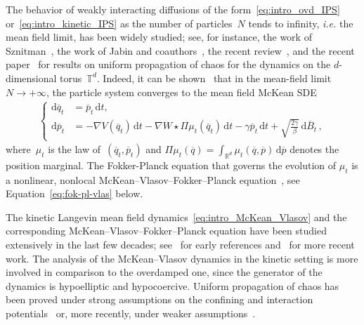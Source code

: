 \documentclass[onefignum,onetabnum]{siamart251216} %
\renewcommand{\d}{\mathrm{d}}
\newcommand{\torus}{\mathbb T}
\newcommand{\mescin}{\mu}
\newcommand{\projp}{\Pi}
\newcommand{\ql}{\overline q}
\newcommand{\pl}{\overline p}
\newcommand{\bl}{\overline B}
\theoremstyle{plain}
\numberwithin{equation}{section}
\numberwithin{theorem}{section}
\begin{document}
The behavior of weakly interacting diffusions of the form~\eqref{eq:intro_ovd_IPS} or~\eqref{eq:intro_kinetic_IPS} as the number of particles~$N$ tends to infinity, \textit{i.e.}\!\! the mean field limit, has been widely studied; see, for instance, the work of Sznitman~\cite{sznitman1991topics},
the work of Jabin and coauthors~\cite{jabin2014review,jabin2016mean,jabin2017mean},
the recent review~\cite{chaintron2022propagationI,chaintron2021propagationII},
and the recent paper~\cite{delarue2025uniform} for results on uniform propagation of chaos for the dynamics on the $d$-dimensional torus~$\torus^d$.
Indeed, it can be shown~\cite{GLWZ2021, guillin2021uniform} that in the mean-field limit~$N\to +\infty$, the particle system converges to the mean field McKean SDE
\begin{align}
    \label{eq:intro_McKean_Vlasov}
    \left\{
        \begin{aligned}
            \d \ql_t &= \displaystyle \pl_t \,\d t, \, \\
            \d \pl_t &= \displaystyle -\nabla V(\ql_t) \,\d t - \nabla W \star \projp \mescin_t (\ql_t)\,\d t -\gamma \pl_t \,\d t +\sqrt{\frac{2\gamma}{\beta}}\,\d \bl_t \, ,
        \end{aligned}
    \right.
\end{align}
where~$\mescin_t$ is the law of~$(\ql_t, \pl_t)$ and $\projp \mescin_t (\ql) =\int_{\mathbb{R}^d} \mescin_t(\ql, \pl) \, \d \pl$ denotes the position marginal.
The Fokker-Planck equation that governs the evolution of $\mu_t$ is a nonlinear, nonlocal McKean--Vlasov--Fokker--Planck equation~\cite{DuPeZi_2013}, see Equation~\eqref{eq:fok-pl-vlas} below.

The kinetic Langevin mean field dynamics~\eqref{eq:intro_McKean_Vlasov} and the corresponding McKean--Vlasov--Fokker--Planck equation have been studied extensively in the last few decades; see~\cite{dressler1987stationary, dressler1990steady} for early references and~\cite{guillin2021kinetic, guillin2021uniform} for more recent work. The analysis of the McKean--Vlasov dynamics in the kinetic setting is more involved in comparison to the overdamped one, since the generator of the dynamics is hypoelliptic and hypocoercive. Uniform propagation of chaos has been proved  under strong assumptions on the confining and interaction potentials~\cite{guillin2022convergence,guillin2021uniform} or, more recently, under weaker assumptions~\cite{monmarche2024time,chen2024uniform,gong2024uniform}.
\end{document}
